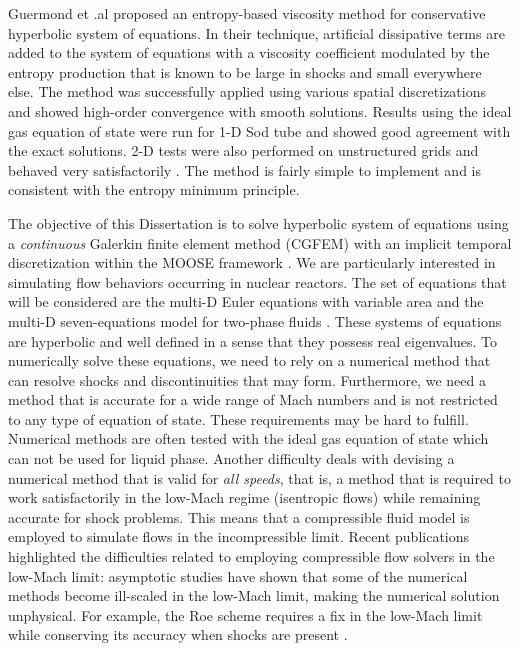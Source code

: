 Guermond et .al \cite{jlg1, jlg2, jlg3} proposed an entropy-based viscosity method for conservative hyperbolic system of equations. In their technique, artificial dissipative terms are added to the system of equations with a viscosity coefficient modulated by the entropy production that is known to be large in shocks and small everywhere else. The method was successfully applied using various spatial discretizations \cite{jlg2, jlg3, valentin} and showed high-order convergence with smooth solutions. Results using the ideal gas equation of state were run for 1-D Sod tube and showed good agreement with the exact solutions. 2-D tests were also performed on unstructured grids and behaved very satisfactorily \cite{jlg1,valentin}. The method is fairly simple to implement and is consistent with the entropy minimum principle.


The objective of this Dissertation is to solve hyperbolic system of equations using a \emph{continuous} Galerkin finite element method (CGFEM) with an implicit temporal discretization within the MOOSE framework \cite{Moose}. We are particularly interested in simulating flow behaviors occurring in nuclear reactors. The set of equations that will be considered are the multi-D Euler equations with variable area \cite{Toro} and the multi-D seven-equations model for two-phase fluids \cite{SEM}. These systems of equations are hyperbolic and well defined in a sense that they possess real eigenvalues. To numerically solve these equations, we need to rely on a numerical method that can resolve shocks and discontinuities that may form. Furthermore, we need a method that is accurate for a wide range of Mach numbers and is not restricted to any type of equation of state. These requirements may be hard to fulfill. Numerical methods are often tested with the ideal gas equation of state which can not be used for liquid phase. Another difficulty deals with devising a numerical method that is valid for \emph{all speeds}, that is, a method that is required to work  satisfactorily in the low-Mach regime (isentropic flows) while remaining accurate for shock problems. This means that a compressible fluid model is employed to simulate flows in the incompressible limit. Recent publications \cite{LowMach1, LowMach2} highlighted the difficulties related to employing compressible flow solvers in the low-Mach limit: asymptotic studies have shown that some of the numerical methods become ill-scaled in the low-Mach limit, making the numerical solution unphysical. For example, the Roe scheme requires a fix in the low-Mach limit while conserving its accuracy when shocks are present \cite{Roe}. 


